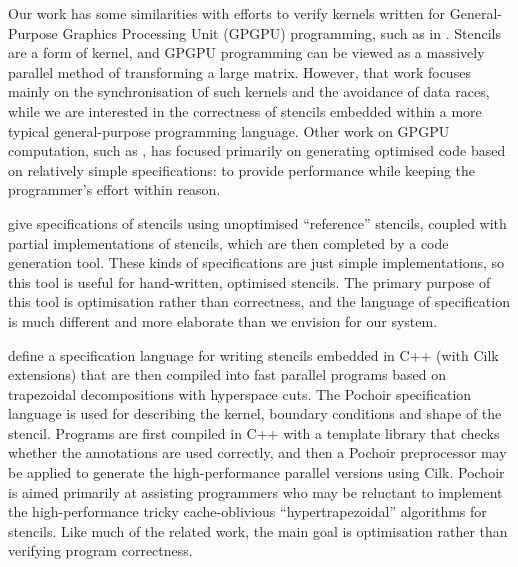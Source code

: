 \documentclass[9pt,preprint]{sigplanconf}
\theoremstyle{definition}
\begin{document}
Our work has some similarities with efforts to verify kernels
written for General-Purpose Graphics Processing Unit (GPGPU)
programming, such as in \citet{Blom:2014:SoCP}. Stencils are a form of
kernel, and GPGPU programming can be viewed as a massively parallel
method of transforming a large matrix. However, that work focuses
mainly on the synchronisation of such kernels and the avoidance of
data races, while we are interested in the correctness of stencils
embedded within a more typical general-purpose programming
language. Other work on GPGPU computation, such as
\citet{Zhang:2012:CGO}, has focused primarily on generating
optimised code based on relatively simple specifications: to
provide performance while keeping the programmer's effort within
reason.

\citet{Solar-Lezama:2007:PLDI} give specifications of stencils using
unoptimised ``reference'' stencils, coupled with partial
implementations of stencils, which are then completed by a code
generation tool. These kinds of specifications are just simple
implementations, so this tool is useful for hand-written, optimised
stencils. The primary purpose of this tool is optimisation rather than
correctness, and the language of specification is much different and
more elaborate than we envision for our system.

\citet{Tang:2011:SPAA} define a specification language for writing
stencils embedded in C++ (with Cilk extensions) that are then compiled
into fast parallel programs based on trapezoidal decompositions with
hyperspace cuts. The Pochoir specification language is used for
describing the kernel, boundary conditions and shape of the
stencil. Programs are first compiled in C++ with a template library
that checks whether the annotations are used correctly, and then a
Pochoir preprocessor may be applied to generate the high-performance
parallel versions using Cilk.  Pochoir
is aimed primarily at assisting programmers who may be reluctant to
implement the high-performance tricky cache-oblivious
``hypertrapezoidal'' algorithms for stencils. 
Like much of the related work, the main goal 
is optimisation rather than verifying program correctness.
\end{document}
